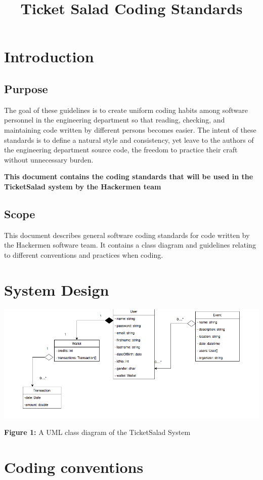 \documentclass[11pt]{article}
\begin{document}
	\title{Ticket Salad Coding Standards}
	\date{}
	\maketitle
	\newpage
	\tableofcontents
	\newpage
	
	\section{Introduction}
	\subsection{Purpose}
	The goal of these guidelines is to create uniform coding habits among software personnel in the
	engineering department so that reading, checking, and maintaining code written by different persons
	becomes easier. The intent of these standards is to define a natural style and consistency, yet leave
	to the authors of the engineering department source code, the freedom to practice their craft without
	unnecessary burden.
	
	
	\textbf{This document contains the coding standards that will be used in the TicketSalad system by the Hackermen team}
	\subsection{Scope}
	This document describes general software coding standards for code written by the Hackermen software team. It contains a class diagram and guidelines relating to different conventions and practices when coding.
	\section{System Design}
	\includegraphics[scale=0.5]{Domain.png}
	\caption{\textbf{Figure 1:} A UML class diagram of the TicketSalad System}
	\section{Coding conventions}
\end{document}
